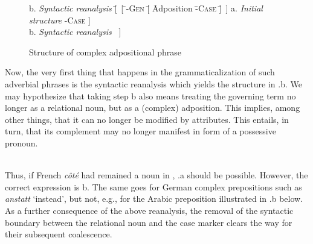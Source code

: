 \begin{figure}
	\begin{tabbing}
		b. \hspace{.75cm} \= \textit{Syntactic reanalysis} \hspace{1cm} \= [~[ \= \np-\textsc{Gen} \= [ \= Adposition \= -\textsc{Case} \= ]~]\kill
		a.	\>	\textit{Initial structure}	\> [~[ \>  \np-\textsc{Gen} \> \>  N\textsubscript{rel} ] \>  {}-\textsc{Case} \> ] \\
		b. \> \textit{Syntactic reanalysis} \> [ \> \np-\textsc{Gen} \> [ \> Adposition \> -\textsc{Case} \> ]~]\\[-2\baselineskip]
	\end{tabbing}
	\caption{Structure of complex adpositional phrase} \label{fig:structureadpos}
\end{figure}

\noindent Now, the very first thing that happens in the grammaticalization of such adverbial phrases is the syntactic reanalysis which yields the structure in .b. We may hypothesize that taking step b also means treating the governing term no longer as a relational noun, but as a (complex) adposition. This implies, among other things, that it can no longer be modified by attributes. This entails, in turn, that its complement may no longer manifest in form of a possessive pronoun.

\ea\label{ex:E53}
\langinfo{\LangFren}{}{} \\
 \z
\z
\newpage
\noindent Thus, if French \textit{côté} had remained a noun in , .a should be possible. However, the correct expression is b. The same goes for German complex prepositions such as \textit{anstatt} ‘instead’, but not, e.g., for the Arabic preposition illustrated in .b below. As a further consequence of the above reanalysis, the removal of the syntactic boundary between the relational noun and the case marker clears the way for their subsequent coalescence.

